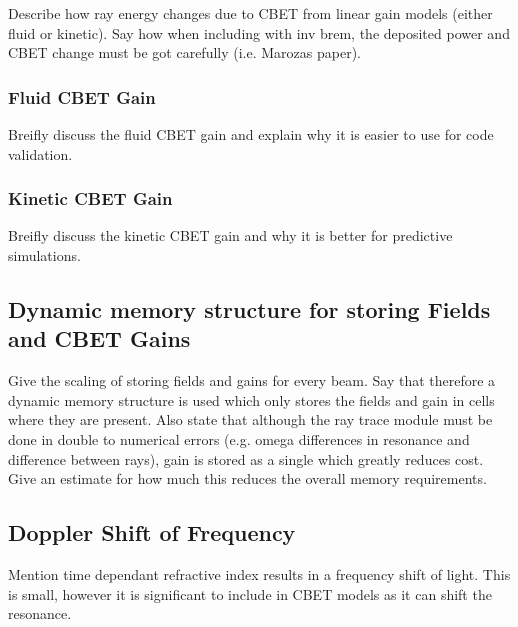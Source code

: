 Describe how ray energy changes due to CBET from linear gain models (either fluid or kinetic).
Say how when including with inv brem, the deposited power and CBET change must be got carefully (i.e. Marozas paper).

\subsubsection{Fluid CBET Gain}

Breifly discuss the fluid CBET gain and explain why it is easier to use for code validation.

\subsubsection{Kinetic CBET Gain}

Breifly discuss the kinetic CBET gain and why it is better for predictive simulations.

\subsection{Dynamic memory structure for storing Fields and CBET Gains}

Give the scaling of storing fields and gains for every beam.
Say that therefore a dynamic memory structure is used which only stores the fields and gain in cells where they are present.
Also state that although the ray trace module must be done in double to numerical errors (e.g. omega differences in resonance and difference between rays), gain is stored as a single which greatly reduces cost.
Give an estimate for how much this reduces the overall memory requirements.

\subsection{Doppler Shift of Frequency}
\label{sec:SOLAS_doppler}

Mention time dependant refractive index results in a frequency shift of light.
This is small, however it is significant to include in CBET models as it can shift the resonance.

